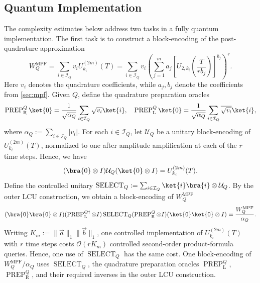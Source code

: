 \documentclass[10pt,reqno]{article}
\numberwithin{equation}{section}
\theoremstyle{plain}
\theoremstyle{definition}
\begin{document}
\subsection{Quantum Implementation}\label{implem}
The complexity estimates below address two tasks in a fully quantum implementation. The first task is to construct a block-encoding of the post-quadrature approximation
\begin{equation}
W_Q^{\operatorname{MPF}} = \sum_{i \in \mathcal{I}_Q} v_i U^{(2m)}_{k_i} (T) = \sum_{i \in \mathcal{I}_Q} v_i \left( \sum_{j=1}^m a_j \left[ U_{2,k_i}\left(\frac{T}{r b_j}\right) \right]^{b_j} \right)^r .
\end{equation}
Here \(v_i\) denotes the quadrature coefficients, while \(a_j,b_j\) denote the coefficients from \cref{sec:mpf}. Given \(Q\), define the quadrature preparation oracles
\begin{equation}
\operatorname{PREP}^Q_{\operatorname{R}}\ket{0} = \frac{1}{\sqrt{\alpha_Q}} \sum_{i\in\mathcal I_Q} \sqrt{v_i}\ket{i}, \quad \operatorname{PREP}^{Q}_{\operatorname{L}}\ket{0} = \frac{1}{\sqrt{\alpha_Q}} \sum_{i\in\mathcal I_Q} \overline{\sqrt{v_i}}\ket{i},
\end{equation}
where \(\alpha_Q:=\sum_{i\in\mathcal I_Q}|v_i|\).  For each \(i\in\mathcal I_Q\), let \(\mathcal U_Q\) be a unitary block-encoding of \(U_{k_i}^{(2m)}(T)\), normalized to one after amplitude amplification at each of the $r$ time steps. Hence, we have 
\begin{equation}
(\bra{0} \otimes I)\mathcal U_Q (\ket{0} \otimes I) = U_{k_i}^{(2m)}(T).
\end{equation}
Define the controlled unitary $\operatorname{SELECT}_Q := \sum_{i\in\mathcal I_Q} \ket{i}\bra{i}\otimes \mathcal U_Q$. By the outer LCU construction, we obtain a block-encoding of $W_Q^{\operatorname{MPF}}$
\begin{equation}
(\bra{0} \bra{0} \otimes I) (\operatorname{PREP}_{\operatorname L}^{Q\dagger}\otimes I) \operatorname{SELECT}_Q (\operatorname{PREP}_{\operatorname R}^{Q}\otimes I) (\ket{0} \ket{0} \otimes I) = \frac{W_Q^{\operatorname{MPF}}}{\alpha_Q}.
\end{equation}
Writing \(K_m:=\|\vec a\|_1\|\vec b\|_1\), one controlled implementation of \(U_{k_i}^{(2m)}(T)\) with \(r\) time steps costs \(\mathcal O(rK_m)\) controlled second-order product-formula queries. Hence, one use of \(\operatorname{SELECT}_Q\) has the same cost. One block-encoding of \(W_Q^{\operatorname{MPF}}/\alpha_Q\) uses \(\operatorname{SELECT}_Q\), the quadrature preparation oracles \(\operatorname{PREP}_{\operatorname L}^{Q}\), \(\operatorname{PREP}_{\operatorname R}^{Q}\), and their required inverses in the outer LCU construction.
\end{document}
